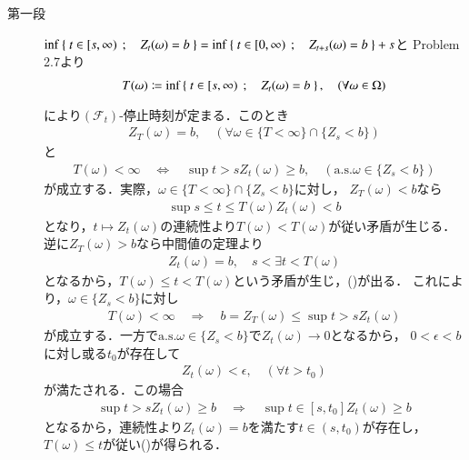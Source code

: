 	\begin{prf}\mbox{}
		\begin{description}
			\item[第一段] $\operatorname*{inf}_{} \left\{\ t \in [s,\infty)\ \, ; \quad Z_t(\omega) = b\ \right\} = \operatorname*{inf}_{} \left\{\ t \in [0,\infty)\ \, ; \quad Z_{t+s}(\omega) = b\ \right\} + s$と
				Problem 2.7より
				\begin{align}
					T(\omega) \coloneqq \operatorname*{inf}_{} \left\{\ t \in [s,\infty)\ \, ; \quad Z_t(\omega) = b\ \right\},
					\quad (\forall \omega \in \Omega)
				\end{align}
				により$(\mathscr{F}_t)$-停止時刻が定まる．このとき
				\begin{align}
					Z_T(\omega) = b,
					\quad (\forall \omega \in \{T < \infty\} \cap \{Z_s < b\})
					\label{eq:chapter_1_Problem_3_28_1}
				\end{align}
				と
				\begin{align}
					T(\omega) < \infty
					\quad \Leftrightarrow \quad
					\sup{t > s}{Z_t(\omega)} \geq b,
					\quad (\mbox{a.s.}\omega \in \{Z_s < b\})
					\label{eq:chapter_1_Problem_3_28_2}
				\end{align}
				が成立する．実際，$\omega \in \{T < \infty\} \cap \{Z_s < b\}$に対し，
				$Z_T(\omega) < b$なら
				\begin{align}
					\sup{s \leq t \leq T(\omega)}{Z_t(\omega)} < b
				\end{align}
				となり，$t \longmapsto Z_t(\omega)$の連続性より$T(\omega) < T(\omega)$が従い矛盾が生じる．
				逆に$Z_T(\omega) > b$なら中間値の定理より
				\begin{align}
					Z_t(\omega) = b,
					\quad s < \exists t < T(\omega)
				\end{align}
				となるから，$T(\omega) \leq t < T(\omega)$という矛盾が生じ，()が出る．
				これにより，$\omega \in \{Z_s < b\}$に対し
				\begin{align}
					T(\omega) < \infty \quad \Rightarrow \quad b = Z_T(\omega) \leq \sup{t > s}{Z_t(\omega)}
				\end{align}
				が成立する．一方で$\mbox{a.s.}\omega \in \{Z_s < b\}$で$Z_t(\omega) \longrightarrow 0$となるから，
				$0 < \epsilon < b$に対し或る$t_0$が存在して
				\begin{align}
					Z_t(\omega) < \epsilon,
					\quad (\forall t > t_0)
				\end{align}
				が満たされる．この場合
				\begin{align}
					\sup{t > s}{Z_t(\omega)} \geq b
					\quad \Rightarrow \quad
					\sup{t \in [s,t_0]}{Z_t(\omega)} \geq b
				\end{align}
				となるから，連続性より$Z_t(\omega) = b$を満たす$t \in (s,t_0)$が存在し，
				$T(\omega) \leq t$が従い()が得られる．
				

\end{description}
\end{prf}
